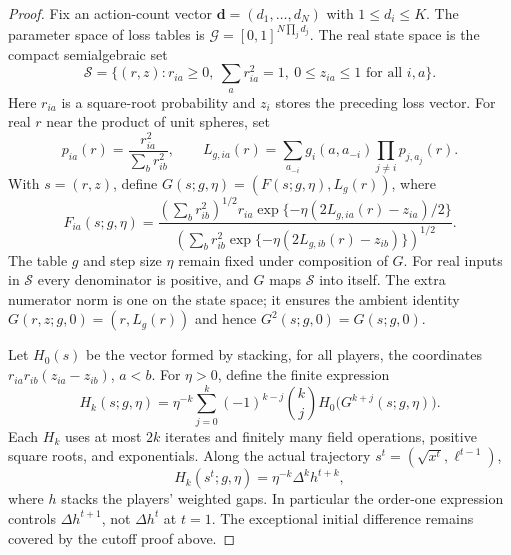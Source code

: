 \documentclass[11pt]{article}
\begin{document}
\begin{proof}
Fix an action-count vector $\mathbf d=(d_1,\ldots,d_N)$ with
$1\leq d_i\leq K$. The parameter space of loss tables is
$\mathcal G=[0,1]^{N\prod_j d_j}$. The real state space is the compact
semialgebraic set
\[
 \mathcal S=\{(r,z): r_{ia}\geq0,\ \sum_a r_{ia}^2=1,
                          \ 0\leq z_{ia}\leq1\text{ for all }i,a\}.
\]
Here $r_{ia}$ is a square-root probability and $z_i$ stores the preceding
loss vector. For real $r$ near the product of unit spheres, set
\[
 p_{ia}(r)=\frac{r_{ia}^2}{\sum_b r_{ib}^2},\qquad
 L_{g,ia}(r)=\sum_{a_{-i}}g_i(a,a_{-i})\prod_{j\ne i}p_{j,a_j}(r).
\]
With $s=(r,z)$, define $G(s;g,\eta)=(F(s;g,\eta),L_g(r))$, where
\[
 F_{ia}(s;g,\eta)=
 \frac{\left(\sum_b r_{ib}^2\right)^{1/2}r_{ia}
       \exp\{-\eta(2L_{g,ia}(r)-z_{ia})/2\}}
 {\left(\sum_b r_{ib}^2
       \exp\{-\eta(2L_{g,ib}(r)-z_{ib})\}\right)^{1/2}}.
\]
The table $g$ and step size $\eta$ remain fixed under composition of $G$.
For real inputs in $\mathcal S$ every denominator is positive, and $G$
maps $\mathcal S$ into itself. The extra numerator norm is one on the
state space; it ensures the ambient identity
$G(r,z;g,0)=(r,L_g(r))$ and hence $G^2(s;g,0)=G(s;g,0)$.

Let $H_0(s)$ be the vector formed by stacking, for all players, the
coordinates $r_{ia}r_{ib}(z_{ia}-z_{ib})$, $a<b$. For $\eta>0$, define
the finite expression
\begin{equation}\label{eq:explicit-H}
 H_k(s;g,\eta)=\eta^{-k}
 \sum_{j=0}^k(-1)^{k-j}\binom kj
          H_0\bigl(G^{k+j}(s;g,\eta)\bigr).
\end{equation}
Each $H_k$ uses at most $2k$ iterates and finitely many field operations,
positive square roots, and exponentials. Along the actual trajectory
$s^t=(\sqrt{x^t},\ell^{t-1})$,
\[
 H_k(s^t;g,\eta)=\eta^{-k}\Delta^k h^{t+k},
\]
where $h$ stacks the players' weighted gaps. In particular the order-one
expression controls $\Delta h^{t+1}$, not $\Delta h^t$ at $t=1$.
The exceptional initial difference remains covered by the cutoff proof
above.


\end{proof}
\end{document}
